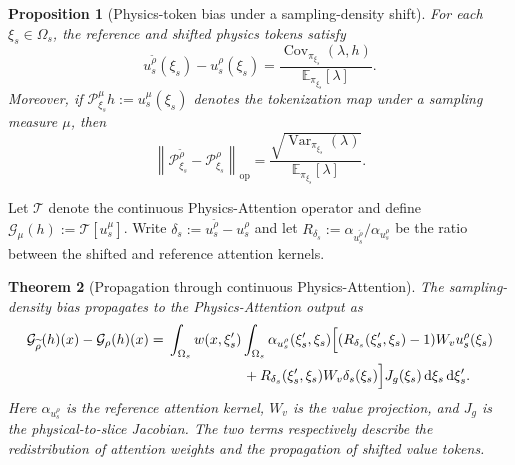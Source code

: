 \documentclass{article}
\newtheorem{proposition}{Proposition}[section]
\newtheorem{theorem}[proposition]{Theorem}
\begin{document}
\begin{proposition}[Physics-token bias under a sampling-density shift]
\label{prop:main_physics_token_bias}
For each $\xi_s\in\Omega_s$, the reference and shifted physics tokens satisfy
\begin{equation}
    u_s^{\widetilde{\rho}}(\xi_s)-u_s^{\rho}(\xi_s)
    =\frac{\operatorname{Cov}_{\pi_{\xi_s}}(\lambda,h)}{\mathbb{E}_{\pi_{\xi_s}}[\lambda]}.
    \label{eq:main_physics_token_bias}
\end{equation}
Moreover, if $\mathcal{P}_{\xi_s}^{\mu}h:=u_s^{\mu}(\xi_s)$ denotes the tokenization map under a sampling measure $\mu$, then
\begin{equation}
    \left\|\mathcal{P}_{\xi_s}^{\widetilde{\rho}}
    -\mathcal{P}_{\xi_s}^{\rho}\right\|_{\mathrm{op}}
    =\frac{\sqrt{\operatorname{Var}_{\pi_{\xi_s}}(\lambda)}}{\mathbb{E}_{\pi_{\xi_s}}[\lambda]}.
    \label{eq:main_token_operator_bias}
\end{equation}
\end{proposition}

Let $\mathcal{T}$ denote the continuous Physics-Attention operator and define $\mathcal{G}_{\mu}(h):=\mathcal{T}[u_s^{\mu}]$. Write $\delta_s:=u_s^{\widetilde{\rho}}-u_s^{\rho}$ and let $R_{\delta_s}:=\alpha_{u_s^{\widetilde{\rho}}}/\alpha_{u_s^{\rho}}$ be the ratio between the shifted and reference attention kernels.

\begin{theorem}[Propagation through continuous Physics-Attention]
\label{thm:main_physics_attention_bias}
The sampling-density bias propagates to the Physics-Attention output as
\begin{align}
    \mathcal{G}_{\widetilde{\rho}}(h)(x)-\mathcal{G}_{\rho}(h)(x)
    ={}&\int_{\Omega_s}w(x,\xi_s')
    \int_{\Omega_s}\alpha_{u_s^{\rho}}(\xi_s',\xi_s)
    \Big[(R_{\delta_s}(\xi_s',\xi_s)-1)W_vu_s^{\rho}(\xi_s)
    \nonumber\\
    &\hspace{19mm}+R_{\delta_s}(\xi_s',\xi_s)W_v\delta_s(\xi_s)\Big]
    J_g(\xi_s)\,\mathrm{d}\xi_s\,\mathrm{d}\xi_s'.
    \label{eq:main_physics_attention_bias}
\end{align}
Here $\alpha_{u_s^{\rho}}$ is the reference attention kernel, $W_v$ is the value projection, and $J_g$ is the physical-to-slice Jacobian. The two terms respectively describe the redistribution of attention weights and the propagation of shifted value tokens.
\end{theorem}
\end{document}
